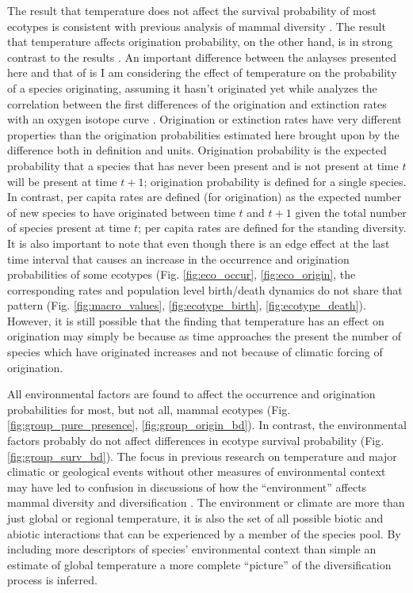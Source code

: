 \documentclass[12pt,letterpaper]{article}
\begin{document}
The result that temperature does not affect the survival probability of most ecotypes is consistent with previous analysis of mammal diversity \citep{Alroy2000g}. The result that temperature affects origination probability, on the other hand, is in strong contrast to the results \citet{Alroy2000g}. An important difference between the anlayses presented here and that of \citet{Alroy2000g} is I am considering the effect of temperature on the probability of a species originating, assuming it hasn't originated yet while \citet{Alroy2000g} analyzes the correlation between the first differences of the origination and extinction rates with an oxygen isotope curve \citep{Zachos2001}. Origination or extinction rates have very different properties than the origination probabilities estimated here brought upon by the difference both in definition and units. Origination probability is the expected probability that a species that has never been present and is not present at time \(t\) will be present at time \(t + 1\); origination probability is defined for a single species. In contrast, per capita rates are defined (for origination) as the expected number of new species to have originated between time \(t\) and \(t + 1\) given the total number of species present at time \(t\); per capita rates are defined for the standing diversity. It is also important to note that even though there is an edge effect at the last time interval that causes an increase in the occurrence and origination probabilities of some ecotypes (Fig. \ref{fig:eco_occur}, \ref{fig:eco_origin}, the corresponding rates and population level birth/death dynamics do not share that pattern (Fig. \ref{fig:macro_values}, \ref{fig:ecotype_birth}, \ref{fig:ecotype_death}). However, it is still possible that the finding that temperature has an effect on origination may simply be because as time approaches the present the number of species which have originated increases and not because of climatic forcing of origination. 

All environmental factors are found to affect the occurrence and origination probabilities for most, but not all, mammal ecotypes (Fig. \ref{fig:group_pure_presence}, \ref{fig:group_origin_bd}). In contrast, the environmental factors probably do not affect differences in ecotype survival probability (Fig. \ref{fig:group_surv_bd}). The focus in previous research on temperature and major climatic or geological events without other measures of environmental context may have led to confusion in discussions of how the ``environment'' affects mammal diversity and diversification \citep{Alroy2000g,Figueirido2012}. The environment or climate are more than just global or regional temperature, it is also the set of all possible biotic and abiotic interactions that can be experienced by a member of the species pool. By including more descriptors of species' environmental context than simple an estimate of global temperature a more complete ``picture'' of the diversification process is inferred.
\end{document}
